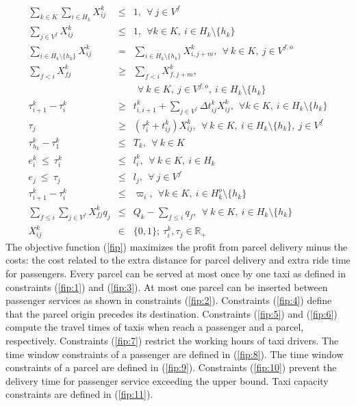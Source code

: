 \documentclass[preprint,authoryear,12pt]{elsarticle}
\begin{document}
 \begin{eqnarray}
\sum\limits_{k\in K}\sum\limits_{i\in H_k}X_{ij}^{k} &\leq& 1,~~\forall~j\in V^f \label{fip:1}\\
\sum\limits_{j\in V^f}X_{ij}^{k}&\leq& 1,~~\forall k\in K,~i\in H_k\setminus \{h_k\} \label{fip:2} \\
\sum\limits_{i\in H_k\setminus \{h_k\}}X_{ij}^{k}&=&\sum\limits_{i\in H_k\setminus \{h_k\}}X_{i,j+m}^{k},~~ \forall~k\in K,~j\in V^{f,o} \label{fip:3}\\
\sum\limits_{f<i}X_{fj}^{k}&\geq& \sum\limits_{f<i}X_{f,j+m}^{k},\nonumber\\
&&~~\forall~k\in K,~j\in V^{f,o},~i\in H_k\setminus \{h_k\} \label{fip:4}\\
\tau_{i+1}^{k}-\tau_i^k&\geq&t_{i,i+1}^k+\sum\limits_{j\in V^f}\Delta t_{ij}^k X_{ij}^{k},~~\forall k\in K,~i\in H_k\setminus \{h_k\} \label{fip:5} \\
\tau_j&\geq&(\tau_i^k+t_{ij}^k)X_{ij}^k,~~\forall~k\in K,~i\in H_k\setminus \{h_k\},~j\in V^{f} \label{fip:6}\\
\tau_{h_k}^k-\tau_1^k &\leq& T_k,~~\forall~k\in K \label{fip:7}\\
e_i^k ~\leq~ \tau_i^k &\leq& l_i^k,~~\forall~k\in K,~i\in H_k \label{fip:8}\\
e_j ~\leq~ \tau_j &\leq& l_j,~~\forall~j\in V^f \label{fip:9}\\
\tau_{i+1}^{k}-\tau_i^k&\leq&\varpi_i,~~\forall k\in K,~i\in H_k^o\setminus \{h_k\} \label{fip:10} \\
\sum\limits_{f\leq i}\sum\limits_{j\in V^f}X_{fj}^{k}q_j &\leq& Q_k-\sum\limits_{f\leq i}q_f,~~\forall~k\in K,~i\in H_k\setminus \{h_k\}  \label{fip:11}\\
X_{ij}^k &\in & \{0,1\};~\tau_i^k,\tau_j \in \mathbb{R}_+
\end{eqnarray}
The objective function (\ref{fip}) maximizes the profit from parcel delivery minus the costs: the cost related to the extra distance for parcel delivery and extra ride time for passengers. Every parcel can be served at most once by one taxi as defined in constraints (\ref{fip:1}) and (\ref{fip:3}). At most one parcel can be inserted between passenger services as shown in constraints (\ref{fip:2}). Constraints (\ref{fip:4})  define that the parcel origin precedes its destination. Constraints (\ref{fip:5}) and (\ref{fip:6}) compute the travel times of taxis
when reach a passenger and a parcel, respectively. Constraints (\ref{fip:7}) restrict the working hours of taxi drivers. The time window constraints of a passenger are defined in (\ref{fip:8}). The time window constraints of a parcel are defined in (\ref{fip:9}). Constraints (\ref{fip:10}) prevent the delivery time for passenger service exceeding the upper bound. Taxi capacity constraints are defined in (\ref{fip:11}).
\end{document}
